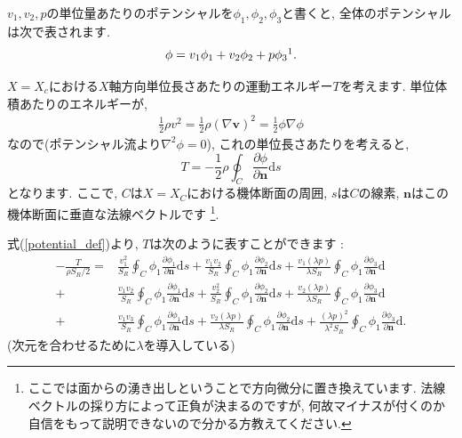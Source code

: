 \documentclass[uplatex,dvipdfmx,a4j,11  pt]{jsarticle}
\newcommand{\diff}{\mathrm{d}} %
\begin{document}
$v_1, v_2, p$の単位量あたりのポテンシャルを$\phi_1, \phi_2, \phi_3$と書くと, 全体のポテンシャルは次で表されます.
\begin{equation}
  \phi = v_1 \phi_1 + v_2 \phi_2 + p \phi_3\footnotemark. \label{potential_def}
\end{equation}


$X = X_c$における$X$軸方向単位長さあたりの運動エネルギー$T$を考えます.
単位体積あたりのエネルギーが,
\begin{align}
  \frac{1}{2}\rho v^2 = \frac{1}{2}\rho \left(\nabla\mathbf{v}\right)^2 = \frac{1}{2}\phi\nabla\phi
\end{align}
なので(ポテンシャル流より$\nabla^2\phi=0$), これの単位長さあたりを考えると,
\begin{equation}
  T = - \frac{1}{2} \rho \oint_C \frac{\partial \phi}{\partial \mathbf{n}} \diff s
\end{equation}
となります.
ここで, $C$は$X=X_C$における機体断面の周囲, $s$は$C$の線素, $\mathbf{n}$はこの機体断面に垂直な法線ベクトルです
\footnote{ここでは面からの湧き出しということで方向微分に置き換えています. 法線ベクトルの採り方によって正負が決まるのですが, 何故マイナスが付くのか自信をもって説明できないので分かる方教えてください.}.

式(\ref{potential_def})より, $T$は次のように表すことができます :
\begin{align}
  -\frac{T}{\rho S_R / 2} = &\frac{v_1^2}{S_R}\oint_C\phi_1\frac{\partial \phi_1}{\partial\mathbf{n}}\diff s
  + \frac{v_1 v_2}{S_R}\oint_C\phi_1\frac{\partial \phi_2}{\partial\mathbf{n}}\diff s
  + \frac{v_1 (\lambda p)}{\lambda S_R}\oint_C\phi_1\frac{\partial \phi_3}{\partial\mathbf{n}}\diff \\
  + &\frac{v_1 v_2}{S_R}\oint_C\phi_1\frac{\partial \phi_1}{\partial\mathbf{n}}\diff s
  + \frac{v_2^2}{S_R}\oint_C\phi_1\frac{\partial \phi_2}{\partial\mathbf{n}}\diff s
  + \frac{v_2 (\lambda p)}{\lambda S_R}\oint_C\phi_1\frac{\partial \phi_3}{\partial\mathbf{n}}\diff \\
  + &\frac{v_1 v_3}{S_R}\oint_C\phi_1\frac{\partial \phi_1}{\partial\mathbf{n}}\diff s
  + \frac{v_2 (\lambda p)}{\lambda S_R}\oint_C\phi_1\frac{\partial \phi_2}{\partial\mathbf{n}}\diff s
  + \frac{(\lambda p)^2}{\lambda^2 S_R}\oint_C\phi_1\frac{\partial \phi_3}{\partial\mathbf{n}}\diff .
\end{align}
(次元を合わせるために$\lambda$を導入している)
\end{document}
